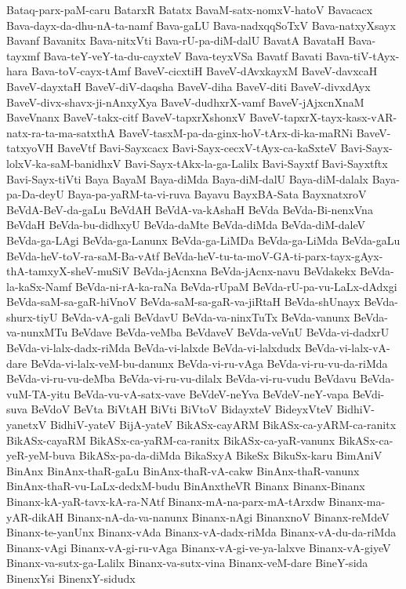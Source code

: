 {Bataq-parx-paM-caru
BatarxR
Batatx
BavaM-satx-nomxV-hatoV
Bavacacx
Bava-dayx-da-dhu-nA-ta-namf
Bava-gaLU
Bava-nadxqqSoTxV
Bava-natxyXsayx
Bavanf
Bavanitx
Bava-nitxVti
Bava-rU-pa-diM-dalU
BavatA
BavataH
Bava-tayxmf
Bava-teY-veY-ta-du-cayxteV
Bava-teyxVSa
Bavatf
Bavati
Bava-tiV-tAyx-hara
Bava-toV-cayx-tAmf
BaveV-cicxtiH
BaveV-dAvxkayxM
BaveV-davxcaH
BaveV-dayxtaH
BaveV-diV-daqsha
BaveV-diha
BaveV-diti
BaveV-divxdAyx
BaveV-divx-shavx-ji-nAnxyXya
BaveV-dudhxrX-vamf
BaveV-jAjxcnXnaM
BaveVnanx
BaveV-takx-citf
BaveV-tapxrXshonxV
BaveV-tapxrX-tayx-kasx-vAR-natx-ra-ta-ma-satxthA
BaveV-tasxM-pa-da-ginx-hoV-tArx-di-ka-maRNi
BaveV-tatxyoVH
BaveVtf
Bavi-Sayxcacx
Bavi-Sayx-cecxV-tAyx-ca-kaSxteV
Bavi-Sayx-lolxV-ka-saM-banidhxV
Bavi-Sayx-tAkx-la-ga-Lalilx
Bavi-Sayxtf
Bavi-Sayxtftx
Bavi-Sayx-tiVti
Baya
BayaM
Baya-diMda
Baya-diM-dalU
Baya-diM-dalalx
Baya-pa-Da-deyU
Baya-pa-yaRM-ta-vi-ruva
Bayavu
BayxBA-Sata
BayxnatxroV
BeVdA-BeV-da-gaLu
BeVdAH
BeVdA-va-kAshaH
BeVda
BeVda-Bi-nenxVna
BeVdaH
BeVda-bu-didhxyU
BeVda-daMte
BeVda-diMda
BeVda-diM-daleV
BeVda-ga-LAgi
BeVda-ga-Lanunx
BeVda-ga-LiMDa
BeVda-ga-LiMda
BeVda-gaLu
BeVda-heV-toV-ra-saM-Ba-vAtf
BeVda-heV-tu-ta-moV-GA-ti-parx-tayx-gAyx-thA-tamxyX-sheV-muSiV
BeVda-jAcnxna
BeVda-jAcnx-navu
BeVdakekx
BeVda-la-kaSx-Namf
BeVda-ni-rA-ka-raNa
BeVda-rUpaM
BeVda-rU-pa-vu-LaLx-dAdxgi
BeVda-saM-sa-gaR-hiVnoV
BeVda-saM-sa-gaR-va-jiRtaH
BeVda-shUnayx
BeVda-shurx-tiyU
BeVda-vA-gali
BeVdavU
BeVda-va-ninxTuTx
BeVda-vanunx
BeVda-va-nunxMTu
BeVdave
BeVda-veMba
BeVdaveV
BeVda-veVnU
BeVda-vi-dadxrU
BeVda-vi-lalx-dadx-riMda
BeVda-vi-lalxde
BeVda-vi-lalxdudx
BeVda-vi-lalx-vA-dare
BeVda-vi-lalx-veM-bu-danunx
BeVda-vi-ru-vAga
BeVda-vi-ru-vu-da-riMda
BeVda-vi-ru-vu-deMba
BeVda-vi-ru-vu-dilalx
BeVda-vi-ru-vudu
BeVdavu
BeVda-vuM-TA-yitu
BeVda-vu-vA-satx-vave
BeVdeV-neYva
BeVdeV-neY-vapa
BeVdi-suva
BeVdoV
BeVta
BiVtAH
BiVti
BiVtoV
BidayxteV
BideyxVteV
BidhiV-yanetxV
BidhiV-yateV
BijA-yateV
BikASx-cayARM
BikASx-ca-yARM-ca-ranitx
BikASx-cayaRM
BikASx-ca-yaRM-ca-ranitx
BikASx-ca-yaR-vanunx
BikASx-ca-yeR-yeM-buva
BikASx-pa-da-diMda
BikaSxyA
BikeSx
BikuSx-karu
BimAniV
BinAnx
BinAnx-thaR-gaLu
BinAnx-thaR-vA-cakw
BinAnx-thaR-vanunx
BinAnx-thaR-vu-LaLx-dedxM-budu
BinAnxtheVR
Binanx
Binanx-Binanx
Binanx-kA-yaR-tavx-kA-ra-NAtf
Binanx-mA-na-parx-mA-tArxdw
Binanx-ma-yAR-dikAH
Binanx-nA-da-va-nanunx
Binanx-nAgi
BinanxnoV
Binanx-reMdeV
Binanx-te-yanUnx
Binanx-vAda
Binanx-vA-dadx-riMda
Binanx-vA-du-da-riMda
Binanx-vAgi
Binanx-vA-gi-ru-vAga
Binanx-vA-gi-ve-ya-lalxve
Binanx-vA-giyeV
Binanx-va-sutx-ga-Lalilx
Binanx-va-sutx-vina
Binanx-veM-dare
BineY-sida
BinenxYsi
BinenxY-sidudx
}
